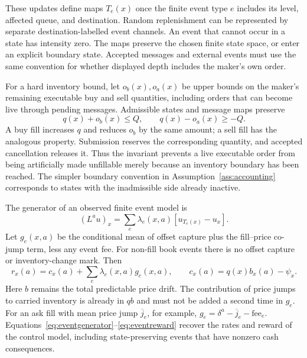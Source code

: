 \documentclass[11pt]{article}
\theoremstyle{plain}
\theoremstyle{definition}
\theoremstyle{remark}
\begin{document}
These updates define maps \(T_e(x)\) once the finite event type \(e\)
includes its level, affected queue, and destination. Random
replenishment can be represented by separate destination-labelled
event channels. An event that cannot occur in a state has intensity
zero. The maps preserve the chosen finite state space, or enter an
explicit boundary state. Accepted messages and external events must
use the same convention for whether displayed depth includes the
maker's own order.

For a hard inventory bound, let \(o_b(x),o_a(x)\) be upper bounds on
the maker's remaining executable buy and sell quantities, including
orders that can become live through pending messages. Admissible states
and message maps preserve
\begin{equation}\label{eq:inventoryreservation}
q(x)+o_b(x)\le Q,\qquad q(x)-o_a(x)\ge-Q.
\end{equation}
A buy fill increases \(q\) and reduces \(o_b\) by the same amount;
a sell fill has the analogous property. Submission reserves the
corresponding quantity, and accepted cancellation releases it.
Thus the invariant prevents a live executable order from being
artificially made unfillable merely because an inventory boundary has
been reached. The simpler boundary convention in
Assumption~\ref{ass:accounting} corresponds to states with the
inadmissible side already inactive.

The generator of an observed finite event model is
\begin{equation}\label{eq:eventgenerator}
(L^a u)_x=\sum_e\lambda_e(x,a)[u_{T_e(x)}-u_x].
\end{equation}
Let \(g_e(x,a)\) be the conditional mean of offset capture plus the
fill--price co-jump term, less any event fee. For non-fill book events
there is no offset capture or inventory-change mark. Then
\begin{equation}\label{eq:eventreward}
r_x(a)=c_x(a)+\sum_e\lambda_e(x,a)g_e(x,a),
\qquad c_x(a)=q(x)b_x(a)-\psi_x.
\end{equation}
Here \(b\) remains the total predictable price drift. The contribution
of price jumps to carried inventory is already in \(q b\) and must
not be added a second time in \(g_e\). For an ask fill with mean
price jump \(\overline j_e\), for example,
\(g_e=\delta^a-\overline j_e-\text{fee}_e\).
Equations~\eqref{eq:eventgenerator}--\eqref{eq:eventreward} recover
the rates and reward of the control model, including state-preserving
events that have nonzero cash consequences.
\end{document}
